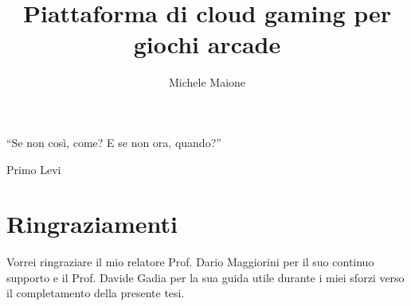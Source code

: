 \documentclass[openany]{book}
\title{Piattaforma di cloud gaming per giochi arcade}
\author{Michele Maione}
\newcounter{savepage}
\begin{document}


\frontmatter
{
\raggedleft \large %
	``Se non così, come? E se non ora, quando?''
	
	\bigskip
	
	\textemdash Primo Levi\\
}

\chapter*{Ringraziamenti}
Vorrei ringraziare il mio relatore Prof. Dario Maggiorini per il suo continuo supporto e il Prof. Davide Gadia per la sua guida utile durante i miei sforzi verso il completamento della presente tesi.



\newpage
\setcounter{tocdepth}{2}
\tableofcontents



\newpage
{}

\mainmatter






\appendix
\newpage
{}
\setcounter{page}{\thesavepage}


%


%
%


\backmatter
\printbibliography[nottype=misc,title={Bibliografia},heading=bibintoc]
\printbibliography[type=misc,title={Sitografia},heading=bibintoc]

\newpage
{}

\end{document}
